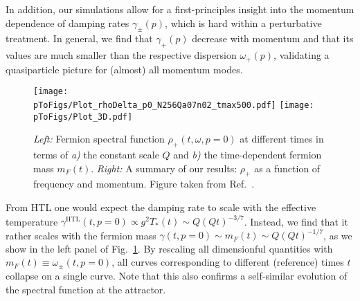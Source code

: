 \documentclass[]{webofc}
\newcommand{\tpert}{t}
\newcommand{\mrm}{\mathrm}
\newcommand{\HTL}{\mrm{HTL}}
\newcommand{\Q}{Q}
\newcommand{\fig}{Fig.~}
\newcommand{\re}{Ref.~}
\newcommand{\pToFigs}{.}
\begin{document}
In addition, our simulations allow for a first-principles insight into the momentum dependence of damping rates $\gamma_{\pm}(p)$, which is hard within a perturbative treatment. In general, we find that $\gamma_{+}(p)$ decrease with momentum and that its values are much smaller than the respective dispersion $\omega_+(p)$, validating a quasiparticle picture for (almost) all momentum modes. 

\begin{figure}[t]
 \centering
 \texttt{[image: \\pToFigs/Plot\_rhoDelta\_p0\_N256Qa07n02\_tmax500.pdf]}
 \texttt{[image: \\pToFigs/Plot\_3D.pdf]}
 \caption{{\em Left: }Fermion spectral function $\rho_+(t, \omega, p{=}0)$ at different times in terms of {\em a)} the constant scale $Q$ and {\em b)} the time-dependent fermion mass $m_F(t)$.
 {\em Right:} A summary of our results: $\rho_+$ as a function of frequency and momentum.
 Figure taken from \re\cite{Boguslavski:2021kdd}.}
 \label{fig:rho_selfsim}
\end{figure}

From HTL \cite{Braaten:1992gd} one would expect the damping rate to scale with the effective temperature $\gamma^\HTL(t,p{=}0) \propto g^2 T_*(t) \sim \Q (\Q t)^{-3/7}$. Instead, we find that it rather scales with the fermion mass $\gamma(t,p{=}0) \sim m_F(t) \sim \Q (\Q t)^{-1/7}$, as we show in the left panel of \fig\ref{fig:rho_selfsim}. By rescaling all dimensionful quantities with $m_F(t) \equiv \omega_\pm(t,p{=}0)$, all curves corresponding to different (reference) times $\tpert$ collapse on a single curve. Note that this also confirms a self-similar evolution of the spectral function at the attractor. 

\begin{comment}
\begin{figure}[t]
 \centering
 \texttt{[image: \\pToFigs/Plot\_3D.pdf]}
 \caption{A summary of our results: $\rho_+$ as a function of frequency and momentum. Figure taken from \re\cite{Boguslavski:2021kdd}.}
 \label{fig:rho_summary}
\end{figure}
\end{comment}

\end{document}
